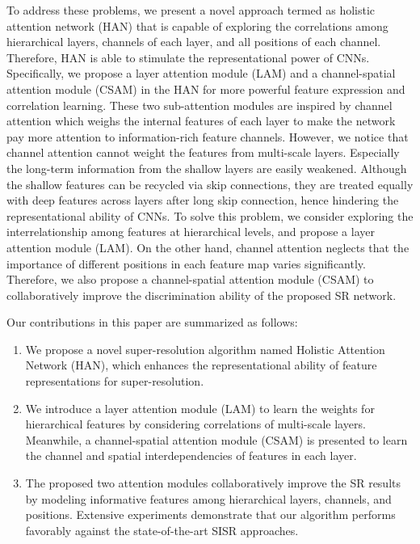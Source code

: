 \documentclass[runningheads]{llncs}
\begin{document}
To address these problems, we present a novel approach termed as holistic attention network (HAN) that is capable of exploring the correlations among hierarchical layers, channels of each layer, and all positions of each channel. Therefore, HAN is able to stimulate the representational power of CNNs.
Specifically, we propose a layer attention module (LAM) and a channel-spatial attention module (CSAM) in the HAN for more powerful feature expression and correlation learning. 
These two sub-attention modules are inspired by channel attention \cite{zhang2018image} which weighs the internal features of each layer to make the network pay more attention to information-rich feature channels.
However, we notice that channel attention cannot weight the features from multi-scale layers. Especially the long-term information from the shallow layers are easily weakened. Although the shallow features can be recycled via skip connections, they are treated equally with deep features across layers after long skip connection, hence hindering the representational ability of CNNs.
To solve this problem, we consider exploring the interrelationship among features at hierarchical levels, and propose a layer attention module (LAM). 
On the other hand, channel attention neglects that the importance of different positions in each feature map varies significantly. Therefore, we also propose a channel-spatial attention module (CSAM) to collaboratively improve the discrimination ability of the proposed SR network.

Our contributions in this paper are summarized as follows:

\begin{enumerate}[]

	\item We propose a novel super-resolution algorithm named Holistic Attention Network (HAN), which enhances the representational ability of feature representations for super-resolution.


	\item We introduce a layer attention module (LAM) to learn the weights for hierarchical features by considering correlations of multi-scale layers.
	Meanwhile, a channel-spatial attention module (CSAM) is presented to learn the channel and spatial interdependencies of features in each layer. 

\item The proposed two attention modules collaboratively improve the SR results by modeling informative features among hierarchical layers, channels, and positions. Extensive experiments demonstrate that our algorithm performs favorably against the state-of-the-art SISR approaches.


\end{enumerate}
\end{document}

